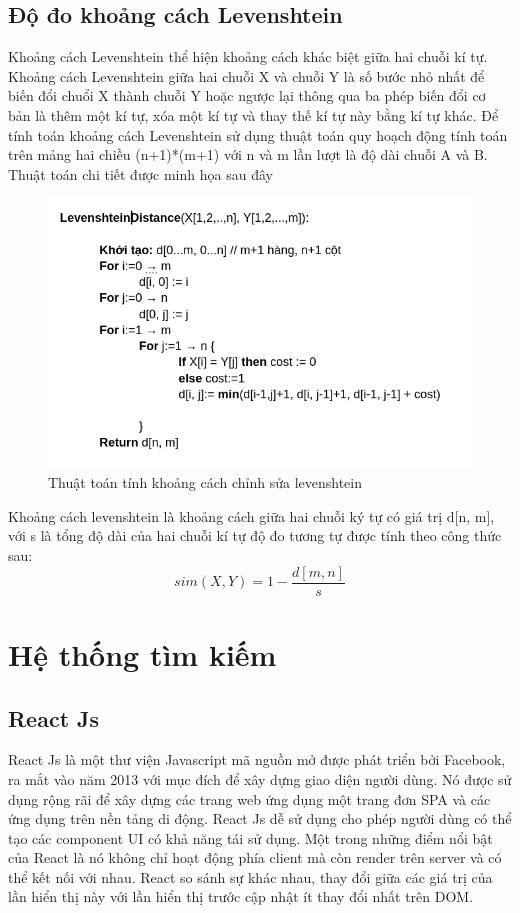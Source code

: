 \documentclass[../DoAn.tex]{subfiles}
\begin{document}
\subsection{Độ đo khoảng cách Levenshtein}
\label{subsection:3.2.3}
Khoảng cách Levenshtein thể hiện khoảng cách khác biệt giữa hai chuỗi kí tự. Khoảng cách Levenshtein giữa hai chuỗi X và chuỗi Y là số bước nhỏ nhất để biến đổi chuổi X thành chuỗi Y hoặc ngược lại thông qua ba phép biến đổi cơ bản là thêm một kí tự, xóa một kí tự và thay thế kí tự này bằng kí tự khác. Để tính toán khoảng cách Levenshtein sử dụng thuật toán quy hoạch động tính toán trên mảng hai chiều (n+1)*(m+1) với n và m lần lượt là độ dài chuỗi A và B. Thuật toán chi tiết được minh họa sau đây

\begin{figure}[H]
    \centering
    \includegraphics[scale=0.65]{Hinhve/levenshtein_algorithms.png}
    \caption{Thuật toán tính khoảng cách chỉnh sửa levenshtein}
    \label{fig:my_label2}
\end{figure}

Khoảng cách levenshtein là khoảng cách giữa hai chuỗi ký tự có giá trị d[n, m], với s là tổng độ dài của hai chuỗi kí tự độ đo tương tự được tính theo công thức sau:
\[sim(X, Y)= 1 - \frac{d[m, n]}{s}\]


\section{Hệ thống tìm kiếm }
\label{section:3.3}

\subsection{React Js}
\label{subsection:3.3.1}
React Js là một thư viện Javascript mã nguồn mở được phát triển bởi Facebook, ra mắt vào năm 2013 với mục đích để xây dựng giao diện người dùng. Nó được sử dụng rộng rãi để xây dựng các trang web ứng dụng một trang đơn SPA và các ứng dụng trên nền tảng di động. React Js dễ sử dụng cho phép người dùng có thể tạo các component UI có khả năng tái sử dụng. Một trong những điểm nổi bật của React là nó không chỉ hoạt động phía client mà còn render trên server và có thể kết nối với nhau. React so sánh sự khác nhau, thay đổi giữa các giá trị của lần hiển thị này với lần hiển thị trước cập nhật ít thay đổi nhất trên DOM.
\end{document}
